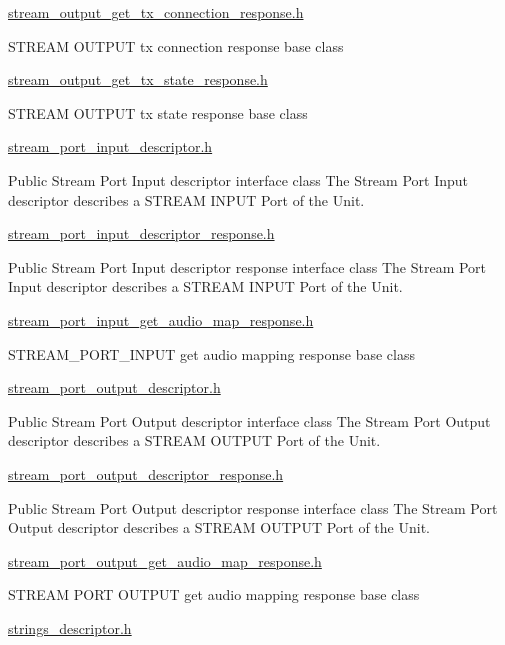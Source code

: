 \hyperlink{stream__output__get__tx__connection__response_8h}{stream\+\_\+output\+\_\+get\+\_\+tx\+\_\+connection\+\_\+response.\+h}

S\+T\+R\+E\+AM O\+U\+T\+P\+UT tx connection response base class

\hyperlink{stream__output__get__tx__state__response_8h}{stream\+\_\+output\+\_\+get\+\_\+tx\+\_\+state\+\_\+response.\+h}

S\+T\+R\+E\+AM O\+U\+T\+P\+UT tx state response base class

\hyperlink{stream__port__input__descriptor_8h}{stream\+\_\+port\+\_\+input\+\_\+descriptor.\+h}

Public Stream Port Input descriptor interface class The Stream Port Input descriptor describes a S\+T\+R\+E\+AM I\+N\+P\+UT Port of the Unit.

\hyperlink{stream__port__input__descriptor__response_8h}{stream\+\_\+port\+\_\+input\+\_\+descriptor\+\_\+response.\+h}

Public Stream Port Input descriptor response interface class The Stream Port Input descriptor describes a S\+T\+R\+E\+AM I\+N\+P\+UT Port of the Unit.

\hyperlink{stream__port__input__get__audio__map__response_8h}{stream\+\_\+port\+\_\+input\+\_\+get\+\_\+audio\+\_\+map\+\_\+response.\+h}

S\+T\+R\+E\+A\+M\+\_\+\+P\+O\+R\+T\+\_\+\+I\+N\+P\+UT get audio mapping response base class

\hyperlink{stream__port__output__descriptor_8h}{stream\+\_\+port\+\_\+output\+\_\+descriptor.\+h}

Public Stream Port Output descriptor interface class The Stream Port Output descriptor describes a S\+T\+R\+E\+AM O\+U\+T\+P\+UT Port of the Unit.

\hyperlink{stream__port__output__descriptor__response_8h}{stream\+\_\+port\+\_\+output\+\_\+descriptor\+\_\+response.\+h}

Public Stream Port Output descriptor response interface class The Stream Port Output descriptor describes a S\+T\+R\+E\+AM O\+U\+T\+P\+UT Port of the Unit.

\hyperlink{stream__port__output__get__audio__map__response_8h}{stream\+\_\+port\+\_\+output\+\_\+get\+\_\+audio\+\_\+map\+\_\+response.\+h}

S\+T\+R\+E\+AM P\+O\+RT O\+U\+T\+P\+UT get audio mapping response base class

\hyperlink{strings__descriptor_8h}{strings\+\_\+descriptor.\+h}


